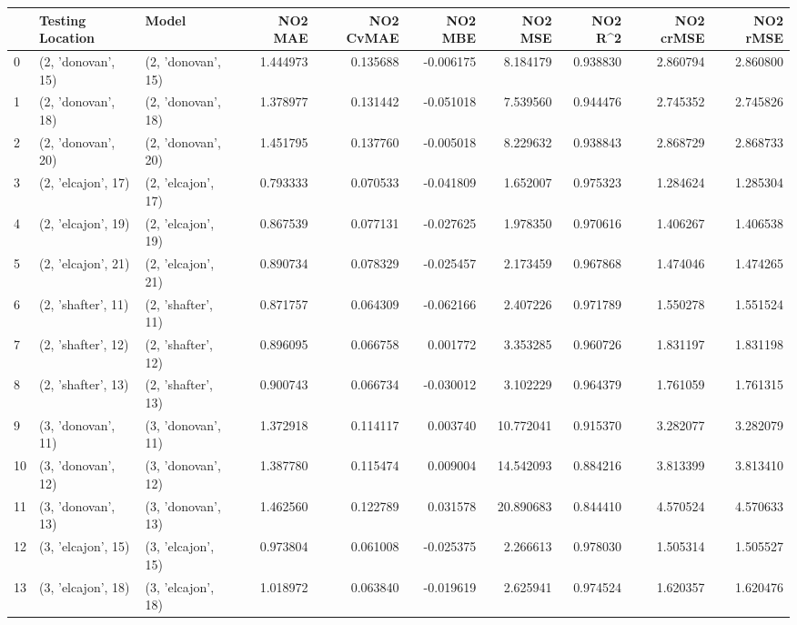 \begin{tabular}{lllrrrrrrr}
\toprule
{} &    Testing Location &               Model &   NO2 MAE &  NO2 CvMAE &   NO2 MBE &    NO2 MSE &   NO2 R\textasciicircum2 &  NO2 crMSE &  NO2 rMSE \\
\midrule
0  &  (2, 'donovan', 15) &  (2, 'donovan', 15) &  1.444973 &   0.135688 & -0.006175 &   8.184179 &  0.938830 &   2.860794 &  2.860800 \\
1  &  (2, 'donovan', 18) &  (2, 'donovan', 18) &  1.378977 &   0.131442 & -0.051018 &   7.539560 &  0.944476 &   2.745352 &  2.745826 \\
2  &  (2, 'donovan', 20) &  (2, 'donovan', 20) &  1.451795 &   0.137760 & -0.005018 &   8.229632 &  0.938843 &   2.868729 &  2.868733 \\
3  &  (2, 'elcajon', 17) &  (2, 'elcajon', 17) &  0.793333 &   0.070533 & -0.041809 &   1.652007 &  0.975323 &   1.284624 &  1.285304 \\
4  &  (2, 'elcajon', 19) &  (2, 'elcajon', 19) &  0.867539 &   0.077131 & -0.027625 &   1.978350 &  0.970616 &   1.406267 &  1.406538 \\
5  &  (2, 'elcajon', 21) &  (2, 'elcajon', 21) &  0.890734 &   0.078329 & -0.025457 &   2.173459 &  0.967868 &   1.474046 &  1.474265 \\
6  &  (2, 'shafter', 11) &  (2, 'shafter', 11) &  0.871757 &   0.064309 & -0.062166 &   2.407226 &  0.971789 &   1.550278 &  1.551524 \\
7  &  (2, 'shafter', 12) &  (2, 'shafter', 12) &  0.896095 &   0.066758 &  0.001772 &   3.353285 &  0.960726 &   1.831197 &  1.831198 \\
8  &  (2, 'shafter', 13) &  (2, 'shafter', 13) &  0.900743 &   0.066734 & -0.030012 &   3.102229 &  0.964379 &   1.761059 &  1.761315 \\
9  &  (3, 'donovan', 11) &  (3, 'donovan', 11) &  1.372918 &   0.114117 &  0.003740 &  10.772041 &  0.915370 &   3.282077 &  3.282079 \\
10 &  (3, 'donovan', 12) &  (3, 'donovan', 12) &  1.387780 &   0.115474 &  0.009004 &  14.542093 &  0.884216 &   3.813399 &  3.813410 \\
11 &  (3, 'donovan', 13) &  (3, 'donovan', 13) &  1.462560 &   0.122789 &  0.031578 &  20.890683 &  0.844410 &   4.570524 &  4.570633 \\
12 &  (3, 'elcajon', 15) &  (3, 'elcajon', 15) &  0.973804 &   0.061008 & -0.025375 &   2.266613 &  0.978030 &   1.505314 &  1.505527 \\
13 &  (3, 'elcajon', 18) &  (3, 'elcajon', 18) &  1.018972 &   0.063840 & -0.019619 &   2.625941 &  0.974524 &   1.620357 &  1.620476 \\

\end{tabular}
